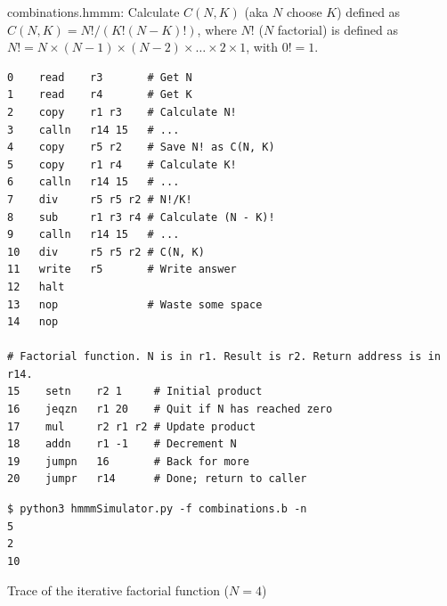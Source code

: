 \documentclass[8pt,a4paper,compress]{beamer}
\begin{document}
\begin{frame}[fragile]
\pause

\begin{framed}
\tiny combinations.hmmm: Calculate $C(N, K)$ (aka $N$ choose $K$) defined as $C(N, K)=N!/(K!(N-K)!)$, where $N!$ ($N$ factorial) is defined as $N! = N \times (N-1) \times (N-2) \times \dots \times 2 \times 1$, with $0! = 1$.
\end{framed}

\begin{lstlisting}[language={}]
0    read    r3       # Get N
1    read    r4       # Get K
2    copy    r1 r3    # Calculate N!
3    calln   r14 15   # ...
4    copy    r5 r2    # Save N! as C(N, K)
5    copy    r1 r4    # Calculate K!
6    calln   r14 15   # ...
7    div     r5 r5 r2 # N!/K!
8    sub     r1 r3 r4 # Calculate (N - K)!
9    calln   r14 15   # ...
10   div     r5 r5 r2 # C(N, K)
11   write   r5       # Write answer
12   halt
13   nop              # Waste some space
14   nop

# Factorial function. N is in r1. Result is r2. Return address is in r14.
15    setn    r2 1     # Initial product
16    jeqzn   r1 20    # Quit if N has reached zero
17    mul     r2 r1 r2 # Update product
18    addn    r1 -1    # Decrement N
19    jumpn   16       # Back for more
20    jumpr   r14      # Done; return to caller
\end{lstlisting}

\pause

\begin{lstlisting}[language={}]
$ python3 hmmmSimulator.py -f combinations.b -n
5
2
10
\end{lstlisting}
\end{frame}

\begin{frame}[fragile]
\pause

Trace of the iterative factorial function ($N=4$)

\begin{center}
\end{center}
\end{frame}
\end{document}
